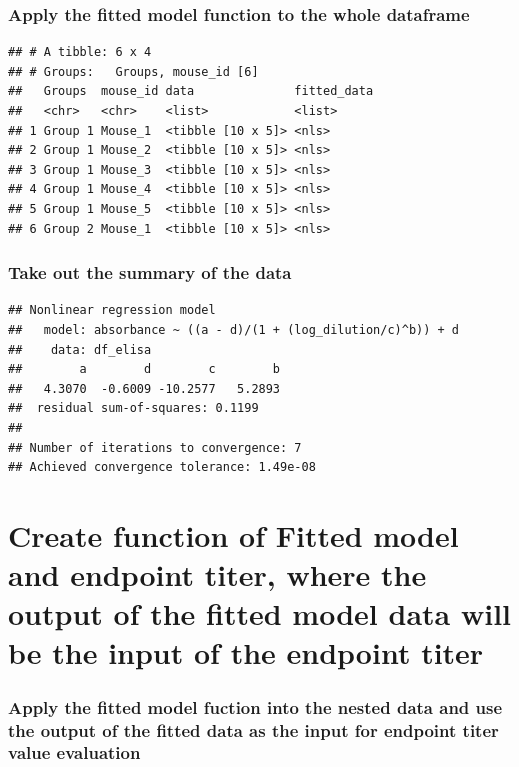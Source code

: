 \documentclass[
]{book}
\begin{document}
\subsubsection{Apply the fitted model function to the whole dataframe}\label{apply-the-fitted-model-function-to-the-whole-dataframe}

\begin{verbatim}
## # A tibble: 6 x 4
## # Groups:   Groups, mouse_id [6]
##   Groups  mouse_id data              fitted_data
##   <chr>   <chr>    <list>            <list>     
## 1 Group 1 Mouse_1  <tibble [10 x 5]> <nls>      
## 2 Group 1 Mouse_2  <tibble [10 x 5]> <nls>      
## 3 Group 1 Mouse_3  <tibble [10 x 5]> <nls>      
## 4 Group 1 Mouse_4  <tibble [10 x 5]> <nls>      
## 5 Group 1 Mouse_5  <tibble [10 x 5]> <nls>      
## 6 Group 2 Mouse_1  <tibble [10 x 5]> <nls>
\end{verbatim}

\subsubsection{Take out the summary of the data}\label{take-out-the-summary-of-the-data}

\begin{verbatim}
## Nonlinear regression model
##   model: absorbance ~ ((a - d)/(1 + (log_dilution/c)^b)) + d
##    data: df_elisa
##        a        d        c        b 
##   4.3070  -0.6009 -10.2577   5.2893 
##  residual sum-of-squares: 0.1199
## 
## Number of iterations to convergence: 7 
## Achieved convergence tolerance: 1.49e-08
\end{verbatim}

\section{Create function of Fitted model and endpoint titer, where the output of the fitted model data will be the input of the endpoint titer}\label{create-function-of-fitted-model-and-endpoint-titer-where-the-output-of-the-fitted-model-data-will-be-the-input-of-the-endpoint-titer}

\subsubsection{Apply the fitted model fuction into the nested data and use the output of the fitted data as the input for endpoint titer value evaluation}\label{apply-the-fitted-model-fuction-into-the-nested-data-and-use-the-output-of-the-fitted-data-as-the-input-for-endpoint-titer-value-evaluation}
\end{document}
